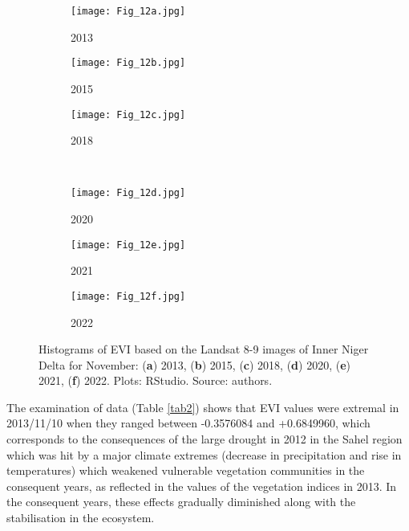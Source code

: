 \documentclass[12pt,a4paper,oneside]{article}
\def \newpar{\vspace{6pt}}
\begin{document}
\begin{figure}[H]
	\begin{subfigure}[b]{.35\textwidth}
		\centering
			\texttt{[image: Fig\_12a.jpg]}
		\caption{2013}
	\end{subfigure}%
	\begin{subfigure}[b]{.35\textwidth}
		\centering
		\texttt{[image: Fig\_12b.jpg]}
		\caption{2015}
	\end{subfigure}%
	\begin{subfigure}[b]{.35\textwidth}
		\centering
		\texttt{[image: Fig\_12c.jpg]}
		\caption{2018}
	\end{subfigure}%
\\
\vfill \vspace{1mm}
	\begin{subfigure}[b]{.35\textwidth}
		\centering
			\texttt{[image: Fig\_12d.jpg]}
		\caption{2020}
	\end{subfigure}%
	\begin{subfigure}[b]{.35\textwidth}
		\centering
			\texttt{[image: Fig\_12e.jpg]}
		\caption{2021}
	\end{subfigure}%
	\begin{subfigure}[b]{.35\textwidth}
		\centering
			\texttt{[image: Fig\_12f.jpg]}
		\caption{2022}
	\end{subfigure}%
\vspace*{20pt}\caption{Histograms of EVI based on the Landsat 8-9 images of Inner Niger Delta for November: (\textbf{a}) 2013, (\textbf{b}) 2015, (\textbf{c}) 2018, (\textbf{d}) 2020, (\textbf{e}) 2021, (\textbf{f}) 2022. Plots: RStudio. Source: authors.}\label{fig12}
\end{figure}

\newpar The examination of data (Table \ref{tab2}) shows that EVI values were extremal in 2013/11/10 when they ranged between -0.3576084 and +0.6849960, which corresponds to the consequences of the large drought in 2012 in the Sahel region which was hit by a major climate extremes (decrease in precipitation and rise in temperatures) which weakened vulnerable vegetation communities in the consequent years, as reflected in the values of the vegetation indices in 2013. In the consequent years, these effects gradually diminished along with the stabilisation in the ecosystem. 
\end{document}
